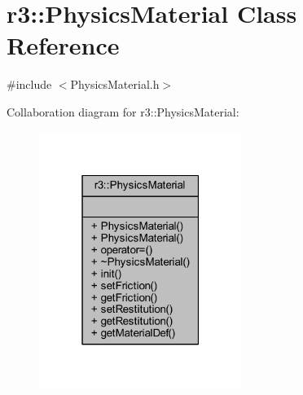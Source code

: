 \hypertarget{classr3_1_1_physics_material}{}\section{r3\+:\+:Physics\+Material Class Reference}
\label{classr3_1_1_physics_material}


{\ttfamily \#include $<$Physics\+Material.\+h$>$}



Collaboration diagram for r3\+:\+:Physics\+Material\+:\nopagebreak
\begin{figure}[H]
\begin{center}
\leavevmode
\includegraphics[width=187pt]{classr3_1_1_physics_material__coll__graph}
\end{center}
\end{figure}

